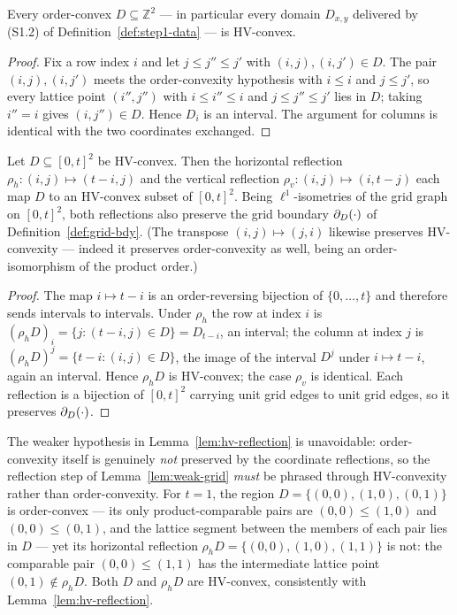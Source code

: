 \begin{lemma}\label{lem:ord-implies-hv}
Every order-convex $D\subseteq\mathbb{Z}^2$ --- in particular every domain
$D_{x,y}$ delivered by \textup{(S1.2)} of
Definition~\textup{\ref{def:step1-data}} --- is HV-convex.
\end{lemma}

\begin{proof}
Fix a row index $i$ and let $j\le j''\le j'$ with $(i,j),(i,j')\in D$. The
pair $(i,j),(i,j')$ meets the order-convexity hypothesis with $i\le i$ and
$j\le j'$, so every lattice point $(i'',j'')$ with $i\le i''\le i$ and
$j\le j''\le j'$ lies in $D$; taking $i''=i$ gives $(i,j'')\in D$. Hence
$D_i$ is an interval. The argument for columns is identical with the two
coordinates exchanged.
\end{proof}

\begin{lemma}\label{lem:hv-reflection}
Let $D\subseteq[0,t]^2$ be HV-convex. Then the horizontal reflection
$\rho_h\colon(i,j)\mapsto(t-i,j)$ and the vertical reflection
$\rho_v\colon(i,j)\mapsto(i,t-j)$ each map $D$ to an HV-convex subset of
$[0,t]^2$. Being $\ell^1$-isometries of the grid graph on $[0,t]^2$, both
reflections also preserve the grid boundary $\partial_D(\cdot)$ of
Definition~\textup{\ref{def:grid-bdy}}. \textup(The transpose
$(i,j)\mapsto(j,i)$ likewise preserves HV-convexity --- indeed it preserves
order-convexity as well, being an order-isomorphism of the product order.\textup)
\end{lemma}

\begin{proof}
The map $i\mapsto t-i$ is an order-reversing bijection of $\{0,\dots,t\}$ and
therefore sends intervals to intervals. Under $\rho_h$ the row at index $i$ is
$(\rho_h D)_i=\{j:(t-i,j)\in D\}=D_{t-i}$, an interval; the column at index
$j$ is $(\rho_h D)^j=\{t-i:(i,j)\in D\}$, the image of the interval $D^j$
under $i\mapsto t-i$, again an interval. Hence $\rho_h D$ is HV-convex; the
case $\rho_v$ is identical. Each reflection is a bijection of $[0,t]^2$
carrying unit grid edges to unit grid edges, so it preserves $\partial_D(\cdot)$.
\end{proof}

\begin{remark}\label{rem:ord-not-stable}
The weaker hypothesis in Lemma~\ref{lem:hv-reflection} is unavoidable:
order-convexity itself is genuinely \emph{not} preserved by the coordinate
reflections, so the reflection step of Lemma~\ref{lem:weak-grid} \emph{must}
be phrased through HV-convexity rather than order-convexity. For $t=1$, the
region $D=\{(0,0),(1,0),(0,1)\}$ is order-convex --- its only
product-comparable pairs are $(0,0)\le(1,0)$ and $(0,0)\le(0,1)$, and the
lattice segment between the members of each pair lies in $D$ --- yet its
horizontal reflection $\rho_h D=\{(0,0),(1,0),(1,1)\}$ is not: the comparable
pair $(0,0)\le(1,1)$ has the intermediate lattice point $(0,1)\notin\rho_h D$.
Both $D$ and $\rho_h D$ are HV-convex, consistently with
Lemma~\ref{lem:hv-reflection}.
\end{remark}

